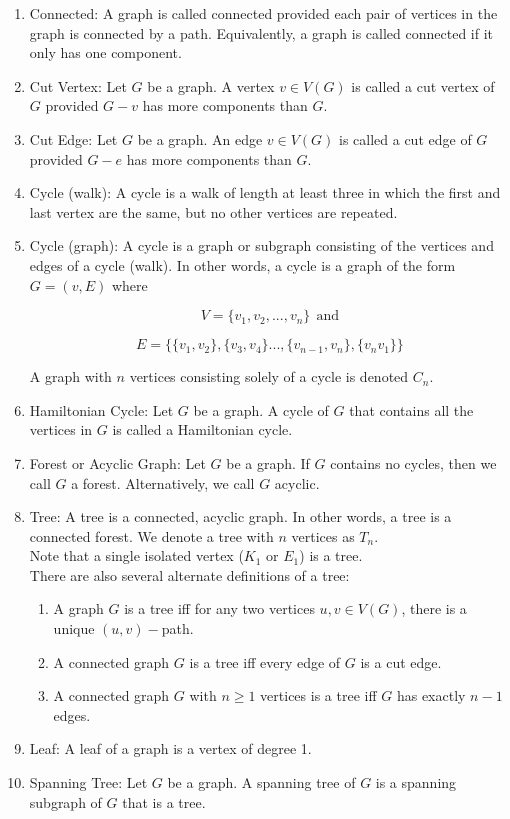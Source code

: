 \documentclass{article}
\begin{document}
\begin{enumerate}
    \item Connected: A graph is called connected provided each pair of vertices in the graph is connected by a path. Equivalently, a graph is called connected if it only has one component. 
    
    \item Cut Vertex: Let $G$ be a graph. A vertex $v\in V(G)$ is called a cut vertex of $G$ provided $G-v$ has more components than $G$.
    
    \item Cut Edge: Let $G$ be a graph. An edge $v\in V(G)$ is called a cut edge of $G$ provided $G-e$ has more components than $G$.
    
    \item Cycle (walk): A cycle is a walk of length at least three in which the first and last vertex are the same, but no other vertices are repeated.
    
    \item Cycle (graph): A cycle is a graph or subgraph consisting of the vertices and edges of a cycle (walk). In other words, a cycle is a graph of the form $G=(v,E)$ where 
    
    $$V=\{v_1,v_2,...,v_n\} \:\: \text{and}$$
    
    $$E=\{\{v_1,v_2\}, \{v_3,v_4\}...,\{v_{n-1},v_n\},\{v_nv_1\}\}$$
    
    A graph with $n$ vertices consisting solely of a cycle is denoted $C_n$.
    
    \item Hamiltonian Cycle: Let $G$ be a graph. A cycle of $G$ that contains all the vertices in $G$ is called a Hamiltonian cycle.
    
    \item Forest or Acyclic Graph: Let $G$ be a graph. If $G$ contains no cycles, then we call $G$ a forest. Alternatively, we call $G$ acyclic.
    
    \item Tree: A tree is a connected, acyclic graph. In other words, a tree is a connected forest. We denote a tree with $n$ vertices as $T_n$.\\
    
    Note that a single isolated vertex ($K_1$ or $E_1$) is a tree.\\
    
    There are also several alternate definitions of a tree:
    
        \begin{enumerate}
            \item A graph $G$ is a tree iff for any two vertices $u,v\in V(G)$, there is a unique $(u,v)-$path. 
            \item A connected graph $G$ is a tree iff every edge of $G$ is a cut edge.
            \item A connected graph $G$ with $n\geq 1$ vertices is a tree iff $G$ has exactly $n-1$ edges.
        \end{enumerate}
        
    \item Leaf: A leaf of a graph is a vertex of degree 1.
    
    \item Spanning Tree: Let $G$ be a graph. A spanning tree of $G$ is a spanning subgraph of $G$ that is a tree. 
    
\end{enumerate}
\end{document}
